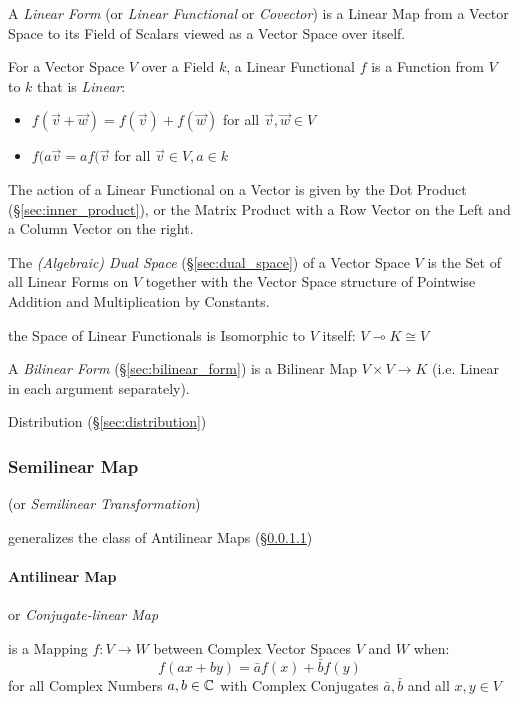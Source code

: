 A \emph{Linear Form} (or \emph{Linear Functional} or \emph{Covector}) is a
Linear Map from a Vector Space to its Field of Scalars viewed as a Vector Space
over itself.

For a Vector Space $V$ over a Field $k$, a Linear Functional $f$ is a Function
from $V$ to $k$ that is \emph{Linear}:
\begin{itemize}
\item $f(\vec{v} + \vec{w}) = f(\vec{v}) + f(\vec{w})$ for all $\vec{v},
  \vec{w} \in V$
\item $f(a\vec{v} = af(\vec{v}$ for all $\vec{v} \in V, a \in k$
\end{itemize}

The action of a Linear Functional on a Vector is given by the Dot Product
(\S\ref{sec:inner_product}), or the Matrix Product with a Row Vector on the
Left and a Column Vector on the right.

The \emph{(Algebraic) Dual Space} (\S\ref{sec:dual_space}) of a Vector Space
$V$ is the Set of all Linear Forms on $V$ together with the Vector Space
structure of Pointwise Addition and Multiplication by Constants.

the Space of Linear Functionals is Isomorphic to $V$ itself:
$V \multimap K \cong V$

A \emph{Bilinear Form} (\S\ref{sec:bilinear_form}) is a Bilinear Map $V \times
V \rightarrow K$ (i.e. Linear in each argument separately).

Distribution (\S\ref{sec:distribution})



\subsubsection{Semilinear Map}\label{sec:semilinear_map}

(or \emph{Semilinear Transformation})

generalizes the class of Antilinear Maps (\S\ref{sec:antilinear_map})



\paragraph{Antilinear Map}\label{sec:antilinear_map}\hfill

or \emph{Conjugate-linear Map}

is a Mapping $f : V \rightarrow W$ between Complex Vector Spaces $V$ and $W$
when:
\[
  f (ax+by) = \bar{a}f(x) + \bar{b}f(y)
\]
for all Complex Numbers $a,b \in \mathbb{C}$ with Complex Conjugates $\bar{a},
\bar{b}$ and all $x,y \in V$

